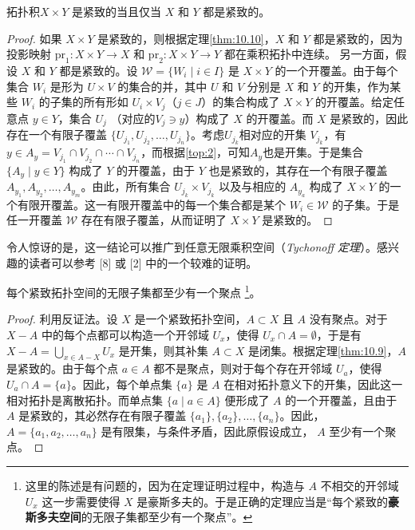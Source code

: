 \begin{theorem}\label{thm:10.11} 
	拓扑积$X\times Y$ 是紧致的当且仅当 $X$ 和 $Y$ 都是紧致的。
\end{theorem}

\begin{proof}
	如果 $X\times Y$ 是紧致的，则根据定理\ref{thm:10.10}，$X$ 和 $Y$ 都是紧致的，因为投影映射 $\mathrm{pr}_{1} :X\times Y\rightarrow X$ 和 $\mathrm{pr}_{2} :X\times Y\rightarrow Y$  都在乘积拓扑中连续。
	另一方面，假设 $X$ 和 $Y$ 都是紧致的。设 $\mathcal{W} =\{W_{i} \mid i\in I\}$ 是 $X\times Y$ 的一个开覆盖。由于每个集合 $W_{i}$ 是形为 $U\times V$ 的集合的并，其中 $U$ 和 $V$ 分别是 $X$ 和 $Y$ 的开集，作为某些 $W_{i}$ 的子集的所有形如 $U_{i} \times V_{j}$（$j\in J$）的集合构成了 $X\times Y$ 的开覆盖。给定任意点 $y\in Y$，集合 $U_{j}$ （对应的$V_{j} \ni y$）构成了 $X$ 的开覆盖。而 $X$ 是紧致的，因此存在一个有限子覆盖 $\{U_{j_{1}} ,U_{j_{2}} ,\dotsc ,U_{j_{n}} \}$。考虑$U_{j_{k}}$相对应的开集 $V_{j_{k}}$，有$y\in A_{y} =V_{j_{1}} \cap V_{j_{2}} \cap \cdots \cap V_{j_{n}}$，而根据\ref{top:2}，可知$A_{y}$也是开集。于是集合 $\{A_{y} \mid y\in Y\}$ 构成了 $Y$ 的开覆盖，由于 $Y$ 也是紧致的，其存在一个有限子覆盖 $A_{y_{1}} ,A_{y_{2}} ,\dotsc ,A_{y_{m}}$。由此，所有集合 $U_{j_{k}} \times V_{j_{k}}$ 以及与相应的 $A_{y_{a}}$ 构成了 $X\times Y$ 的一个有限开覆盖。这一有限开覆盖中的每一个集合都是某个 $W_{i} \in \mathcal{W}$ 的子集。于是任一开覆盖 $\mathcal{W}$ 存在有限子覆盖，从而证明了 $X\times Y$ 是紧致的。
\end{proof}

	令人惊讶的是，这一结论可以推广到任意无限乘积空间（\emph{Tychonoff 定理}）。感兴趣的读者可以参考 [8] 或 [2] 中的一个较难的证明。

\begin{theorem}\label{thm:10.12} 
	每个紧致拓扑空间的无限子集都至少有一个聚点 \footnote{这里的陈述是有问题的，因为在定理证明过程中，构造与 $A$ 不相交的开邻域 $U_{x}$ 这一步需要使得 $X$ 是豪斯多夫的。于是正确的定理应当是“每个紧致的\textbf{豪斯多夫空间}的无限子集都至少有一个聚点”。}。
\end{theorem}

\begin{proof}
	利用反证法。设 $X$ 是一个紧致拓扑空间，$A\subset X$ 且 $A$ 没有聚点。对于 $X-A$ 中的每个点都可以构造一个开邻域 $U_{x}$，使得 $U_{x} \cap A=\emptyset $，于是有$X-A=\bigcup _{x\in A-X} U_{x}$ 是开集，则其补集 $A\subset X$ 是闭集。根据定理\ref{thm:10.9}，$A$ 是紧致的。由于每个点 $a\in A$ 都不是聚点，则对于每个存在开邻域 $U_{a}$，使得 $U_{a} \cap A=\{a\}$。因此，每个单点集 $\{a\}$ 是 $A$ 在相对拓扑意义下的开集，因此这一相对拓扑是离散拓扑。而单点集 $\{a\mid a\in A\}$ 便形成了 $A$ 的一个开覆盖，且由于 $A$ 是紧致的，其必然存在有限子覆盖 $\{a_{1} \},\{a_{2} \},\dotsc ,\{a_{n} \}$。因此，$A=\{a_{1} ,a_{2} ,\dotsc ,a_{n} \}$ 是有限集，与条件矛盾，因此原假设成立， $A$ 至少有一个聚点。
\end{proof}

